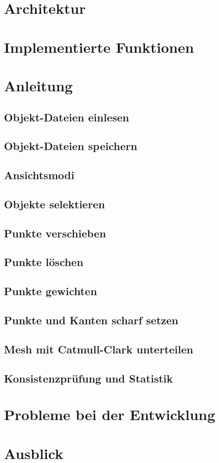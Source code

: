 \newpage
\section{Architektur}
\section{Implementierte Funktionen}
\section{Anleitung}
\subsection{Objekt-Dateien einlesen}
\subsection{Objekt-Dateien speichern}
\subsection{Ansichtsmodi}
\subsection{Objekte selektieren}
\subsection{Punkte verschieben}
\subsection{Punkte löschen}
\subsection{Punkte gewichten}
\subsection{Punkte und Kanten scharf setzen}
\subsection{Mesh mit Catmull-Clark unterteilen}
\subsection{Konsistenzprüfung und Statistik}
\section{Probleme bei der Entwicklung}
\section{Ausblick}